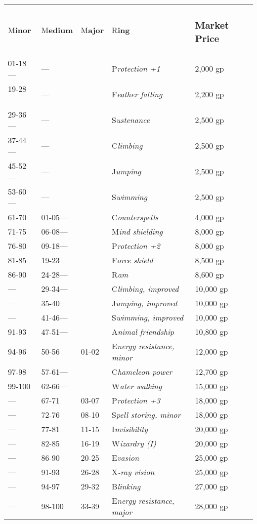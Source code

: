 \documentclass{article}
\begin{document}
\vspace{12pt}
\begin{tabular}{|>{\raggedright}p{34pt}|>{\raggedright}p{40pt}|>{\raggedright}p{31pt}|>{\raggedright}p{117pt}|>{\raggedright}p{60pt}|}
\hline
\multicolumn{5}{|p{284pt}|}{T\textbf{able: Rings}}\tabularnewline
\hline
M\textbf{inor} & M\textbf{edium} & M\textbf{ajor} & R\textbf{ing} & \subsubsection*{M\textbf{arket 
Price}}\tabularnewline
\hline
01-18--- & --- &  & P\textit{rotection +1} & 2,000 gp\tabularnewline
\hline
19-28--- & --- &  & F\textit{eather falling} & 2,200 gp\tabularnewline
\hline
29-36--- & --- &  & S\textit{ustenance} & 2,500 gp\tabularnewline
\hline
37-44--- & --- &  & C\textit{limbing} & 2,500 gp\tabularnewline
\hline
45-52--- & --- &  & J\textit{umping} & 2,500 gp\tabularnewline
\hline
53-60--- & --- &  & S\textit{wimming} & 2,500 gp\tabularnewline
\hline
61-70 & 01-05--- &  & C\textit{ounterspells} & 4,000 gp\tabularnewline
\hline
71-75 & 06-08--- &  & M\textit{ind shielding} & 8,000 gp\tabularnewline
\hline
76-80 & 09-18--- &  & P\textit{rotection +2} & 8,000 gp\tabularnewline
\hline
81-85 & 19-23--- &  & F\textit{orce shield} & 8,500 gp\tabularnewline
\hline
86-90 & 24-28--- &  & R\textit{am} & 8,600 gp\tabularnewline
\hline
--- & 29-34--- &  & C\textit{limbing, improved} & 10,000 gp\tabularnewline
\hline
--- & 35-40--- &  & J\textit{umping, improved} & 10,000 gp\tabularnewline
\hline
--- & 41-46--- &  & S\textit{wimming, improved} & 10,000 gp\tabularnewline
\hline
91-93 & 47-51--- &  & A\textit{nimal friendship} & 10,800 gp\tabularnewline
\hline
94-96 & 50-56 & 01-02 & E\textit{nergy resistance, minor} & 12,000 gp\tabularnewline
\hline
97-98 & 57-61--- &  & C\textit{hameleon power} & 12,700 gp\tabularnewline
\hline
99-100 & 62-66--- &  & W\textit{ater walking} & 15,000 gp\tabularnewline
\hline
--- & 67-71 & 03-07 & P\textit{rotection +3} & 18,000 gp\tabularnewline
\hline
--- & 72-76 & 08-10 & S\textit{pell storing, minor} & 18,000 gp\tabularnewline
\hline
--- & 77-81 & 11-15 & I\textit{nvisibility} & 20,000 gp\tabularnewline
\hline
--- & 82-85 & 16-19 & W\textit{izardry (I)} & 20,000 gp\tabularnewline
\hline
--- & 86-90 & 20-25 & E\textit{vasion} & 25,000 gp\tabularnewline
\hline
--- & 91-93 & 26-28 & X\textit{-ray vision} & 25,000 gp\tabularnewline
\hline
--- & 94-97 & 29-32 & B\textit{linking} & 27,000 gp\tabularnewline
\hline
--- & 98-100 & 33-39 & E\textit{nergy resistance, major} & 28,000 gp\tabularnewline

\end{tabular}
\end{document}
